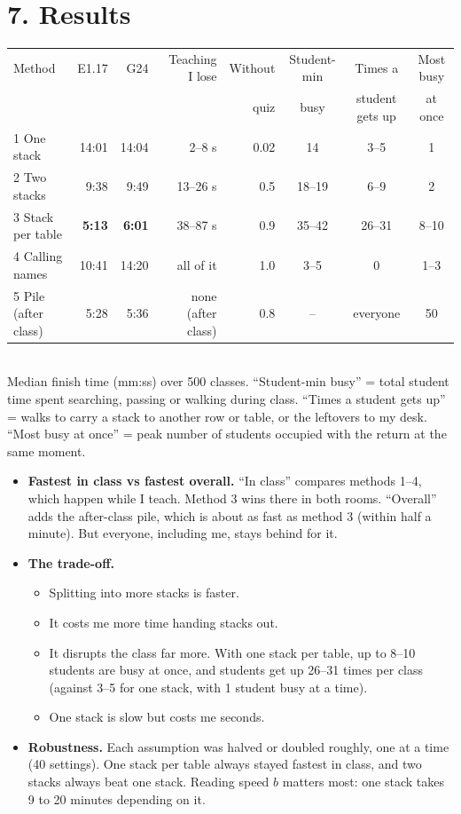 \documentclass[10.5pt,a4paper]{article}
\begin{document}
\section*{7. Results}
\begin{center}\small
\begin{tabular}{lrrrrccc}
\toprule
Method & E1.17 & G24 & Teaching I lose & Without & Student-min & Times a & Most busy \\
 & & & & quiz & busy & student gets up & at once \\
\midrule
1 One stack & 14:01 & 14:04 & 2--8 s & 0.02 & 14 & 3--5 & 1 \\
2 Two stacks & 9:38 & 9:49 & 13--26 s & 0.5 & 18--19 & 6--9 & 2 \\
3 Stack per table & \textbf{5:13} & \textbf{6:01} & 38--87 s & 0.9 & 35--42 & 26--31 & 8--10 \\
4 Calling names & 10:41 & 14:20 & all of it & 1.0 & 3--5 & 0 & 1--3 \\
5 Pile (after class) & 5:28 & 5:36 & none (after class) & 0.8 & -- & everyone & 50 \\
\bottomrule
\end{tabular}
\\[3pt]
{\footnotesize Median finish time (mm:ss) over 500 classes. ``Student-min busy'' = total student time spent searching, passing or walking during class. ``Times a student gets up'' = walks to carry a stack to another row or table, or the leftovers to my desk. ``Most busy at once'' = peak number of students occupied with the return at the same moment.}
\end{center}

\begin{itemize}
\item \textbf{Fastest in class vs fastest overall.} ``In class'' compares methods 1--4, which happen while I teach. Method 3 wins there in both rooms. ``Overall'' adds the after-class pile, which is about as fast as method 3 (within half a minute). But everyone, including me, stays behind for it.
\item \textbf{The trade-off.}
  \begin{itemize}
  \item Splitting into more stacks is faster.
  \item It costs me more time handing stacks out.
  \item It disrupts the class far more. With one stack per table, up to 8--10 students are busy at once, and students get up 26--31 times per class (against 3--5 for one stack, with 1 student busy at a time).
  \item One stack is slow but costs me seconds.
  \end{itemize}
\item \textbf{Robustness.} Each assumption was halved or doubled roughly, one at a time (40 settings). One stack per table always stayed fastest in class, and two stacks always beat one stack. Reading speed $b$ matters most: one stack takes 9 to 20 minutes depending on it.
\end{itemize}
\end{document}

